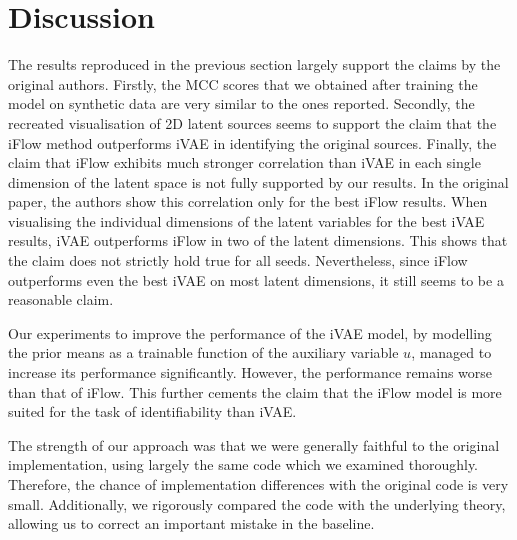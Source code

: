 \section{Discussion}
The results reproduced in the previous section largely support the claims by the original authors. Firstly, the MCC scores that we obtained after training the model on synthetic data are very similar to the ones reported. Secondly, the recreated visualisation of 2D latent sources seems to support the claim that the iFlow method outperforms iVAE in identifying the original sources. Finally, the claim that iFlow exhibits much stronger correlation than iVAE in each single dimension of the latent space is not fully supported by our results. In the original paper, the authors show this correlation only for the best iFlow results. When visualising the individual dimensions of the latent variables for the best iVAE results, iVAE outperforms iFlow in two of the latent dimensions. This shows that the claim does not strictly hold true for all seeds. Nevertheless, since iFlow outperforms even the best iVAE on most latent dimensions, it still seems to be a reasonable claim.

Our experiments to improve the performance of the iVAE model, by modelling the prior means as a trainable function of the auxiliary variable $u$, managed to increase its performance significantly. However, the performance remains worse than that of iFlow. This further cements the claim that the iFlow model is more suited for the task of identifiability than iVAE.

The strength of our approach was that we were generally faithful to the original implementation, using largely the same code which we examined thoroughly. Therefore, the chance of implementation differences with the original code is very small. Additionally, we rigorously compared the code with the underlying theory, allowing us to correct an important mistake in the baseline.

